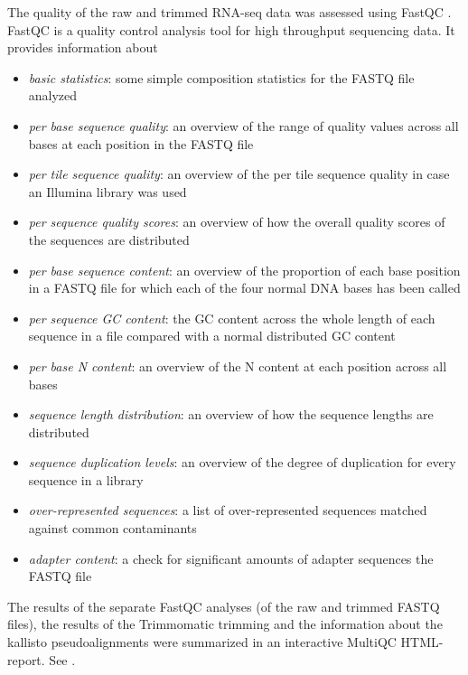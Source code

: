 The quality of the raw and trimmed RNA-seq data was assessed using FastQC \autocite{babraham}. FastQC is a quality control analysis tool for high throughput sequencing data. It provides information about
\begin{itemize}
    \item \emph{basic statistics}: some simple composition statistics for the FASTQ file analyzed
    \item \emph{per base sequence quality}: an overview of the range of quality values across all bases at each position in the FASTQ file
    \item \emph{per tile sequence quality}: an overview of the per tile sequence quality in case an Illumina library was used
    \item \emph{per sequence quality scores}: an overview of how the overall quality scores of the sequences are distributed
    \item \emph{per base sequence content}: an overview of the proportion of each base position in a FASTQ file for which each of the four normal DNA bases has been called
    \item \emph{per sequence GC content}: the GC content across the whole length of each sequence in a file compared with a normal distributed GC content
    \item \emph{per base N content}: an overview of the N content at each position across all bases
    \item \emph{sequence length distribution}: an overview of how the sequence lengths are distributed
    \item \emph{sequence duplication levels}: an overview of the degree of duplication for every sequence in a library
    \item \emph{over-represented sequences}: a list of over-represented sequences matched against common contaminants
    \item \emph{adapter content}: a check for significant amounts of adapter sequences the FASTQ file
\end{itemize}

The results of the separate FastQC analyses (of the raw and trimmed FASTQ files), the results of the Trimmomatic trimming and the information about the kallisto pseudoalignments were summarized in an interactive MultiQC HTML-report. See \autocite{10.1093/bioinformatics/btw354}.


